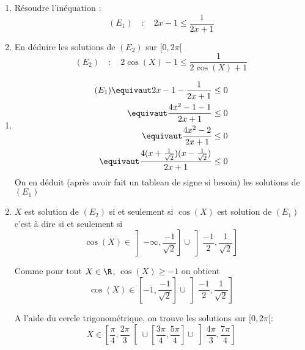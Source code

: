 \documentclass[a4paper, 11pt,reqno]{article}
\begin{document}
\begin{exercice}
\begin{enumerate}
\item Résoudre l'inéquation :  $$ (E_1)   \quad : \quad 2x-1\leq \frac{1}{2x+1}$$
\item En déduire les solutions de $(E_2)$ sur $[0, 2\pi[$
$$(E_2)   \quad : \quad   2\cos(X)-1\leq \frac{1}{2\cos(X)+1}$$

\end{enumerate}

\end{exercice}
\begin{correction}
\begin{enumerate}
\item \begin{align*}
(E_1)\equivaut 2x-1 -\frac{1}{2x+1}\leq 0\\
		\equivaut  \frac{4x^2-1-1}{2x+1}\leq 0\\
		\equivaut  \frac{4x^2-2}{2x+1}\leq 0\\
		\equivaut  \frac{4(x+\frac{1}{\sqrt{2}})(x-\frac{1}{\sqrt{2}}) }{2x+1}\leq 0\\
\end{align*}
On en déduit (après avoir fait un tableau de signe si besoin) les solutions de $(E_1) $
\conclusion{ $S_1 = \left] -\infty, \frac{-1}{\sqrt{2}}\right]\cup \left]\frac{-1}{2} , \frac{1}{\sqrt{2}}\right]$}
\item $X$ est solution de $(E_2)$ si et seulement si $\cos(X) $ est solution de $(E_1)$ c'est à dire si et seulement si 
$$\cos(X) \in  
\left] -\infty, \frac{-1}{\sqrt{2}}\right]\cup \left]\frac{-1}{2} , \frac{1}{\sqrt{2}}\right]$$

Comme pour tout $X\in \R$, $\cos(X)\geq-1$ on obtient 
$$\cos(X) \in  
\left[ -1 ,\frac{-1}{\sqrt{2}}\right]\cup \left]\frac{-1}{2} , \frac{1}{\sqrt{2}}\right]$$

A l'aide du cercle trigonométrique, on trouve les solutions sur $[0,2\pi[:$
$$X\in \left[\frac{\pi}{4}, \frac{2\pi}{3}  \right[ \cup   \left[\frac{3\pi}{4}, \frac{5\pi}{4}\right]  \cup   \left] \frac{4\pi}{3}, \frac{7\pi}{4}\right]$$


\end{enumerate}

\end{correction}
\end{document}
